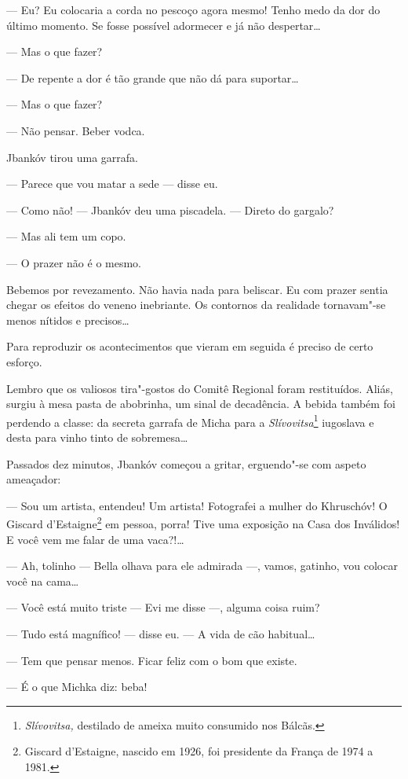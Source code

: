 --- Eu? Eu colocaria a corda no pescoço agora mesmo! Tenho medo
da dor do último momento. Se fosse possível adormecer e já não
despertar\ldots{}

--- Mas o que fazer?

--- De repente a dor é tão grande que não dá para suportar\ldots{}

--- Mas o que fazer?

--- Não pensar. Beber vodca.

Jbankóv tirou uma garrafa.

--- Parece que vou matar a sede --- disse eu.

--- Como não! --- Jbankóv deu uma piscadela. ---
Direto do gargalo?

--- Mas ali tem um copo.

--- O prazer não é o mesmo.

Bebemos por revezamento. Não havia nada para beliscar. Eu com prazer
sentia chegar os efeitos do veneno inebriante. Os contornos da realidade
tornavam"-se menos nítidos e precisos\ldots{}

Para reproduzir os acontecimentos que vieram em seguida é preciso de
certo esforço.

Lembro que os valiosos tira"-gostos do Comitê Regional foram restituídos.
Aliás, surgiu à mesa pasta de abobrinha, um sinal de decadência. A
bebida também foi perdendo a classe: da secreta garrafa de Micha para a
\emph{Slívovitsa}\footnote{\emph{Slívovitsa,} destilado de ameixa muito
  consumido nos Bálcãs.} iugoslava e desta para vinho tinto de
sobremesa\ldots{}

Passados dez minutos, Jbankóv começou a gritar, erguendo"-se com aspeto
ameaçador:

--- Sou um artista, entendeu! Um artista! Fotografei a mulher do
Khruschóv! O Giscard d'Estaigne\footnote{Giscard d'Estaigne, nascido em
  1926, foi presidente da França de 1974 a 1981.} em pessoa, porra! Tive
uma exposição na Casa dos Inválidos! E você vem me falar de uma
vaca?!\ldots{}

--- Ah, tolinho --- Bella olhava para ele admirada
---, vamos, gatinho, vou colocar você na cama\ldots{}

--- Você está muito triste --- Evi me disse ---,
alguma coisa ruim?

--- Tudo está magnífico! --- disse eu. --- A vida
de cão habitual\ldots{}

--- Tem que pensar menos. Ficar feliz com o bom que existe.

--- É o que Michka diz: beba!

